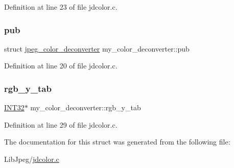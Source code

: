Definition at line 23 of file jdcolor.\+c.

\mbox{\label{structmy__color__deconverter_a54bf241de985ca2e06da2bbee14e745a}} 
\subsubsection{\texorpdfstring{pub}{pub}}
{\footnotesize\ttfamily struct \mbox{\hyperlink{structjpeg__color__deconverter}{jpeg\+\_\+color\+\_\+deconverter}} my\+\_\+color\+\_\+deconverter\+::pub}



Definition at line 20 of file jdcolor.\+c.

\mbox{\label{structmy__color__deconverter_ad34e0f9d33aaf4b6329e65a95ec8130e}} 
\subsubsection{\texorpdfstring{rgb\_y\_tab}{rgb\_y\_tab}}
{\footnotesize\ttfamily \mbox{\hyperlink{jmorecfg_8h_a0cb58e7e6f0bad369840a52e54a56ae0}{I\+N\+T32}}$\ast$ my\+\_\+color\+\_\+deconverter\+::rgb\+\_\+y\+\_\+tab}



Definition at line 29 of file jdcolor.\+c.



The documentation for this struct was generated from the following file\+:\begin{DoxyCompactItemize}
\item 
Lib\+Jpeg/\mbox{\hyperlink{jdcolor_8c}{jdcolor.\+c}}\end{DoxyCompactItemize}
